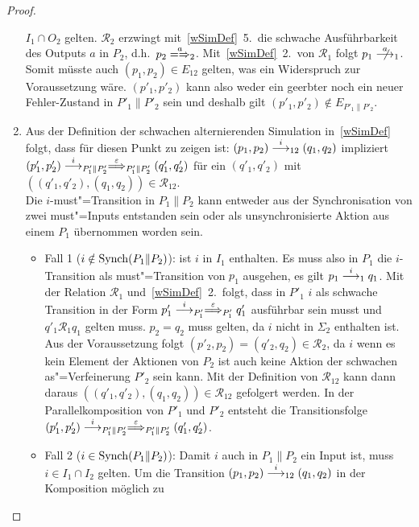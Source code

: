 \begin{proof}
\begin{enumerate}
      $I_1\cap O_2$ gelten. $\mathcal{R}_2$ erzwingt mit~\ref{wSimDef}~5.\ die
      schwache Ausführbarkeit des Outputs $a$ in $P_2$, d.h.\ $p_2
      \weakmay[a]_2$. Mit~\ref{wSimDef}~2.\ von $\mathcal{R}_1$ folgt $p_1
      \nmust[a]_1$. Somit müsste auch $(p_1,p_2)\in E_{12}$ gelten, was ein
      Widerspruch zur Voraussetzung wäre. $(p'_1,p'_2)$ kann also weder ein
      geerbter noch ein neuer Fehler-Zustand in $P'_1\|P'_2$ sein und deshalb
      gilt $(p'_1,p'_2)\notin E_{P'_1\|P'_2}$.
    \item Aus der Definition der schwachen alternierenden
      Simulation in~\ref{wSimDef} folgt, dass für diesen Punkt zu zeigen ist:
      $(p_1,p_2)\must[i]_{12}(q_1,q_2)$ impliziert $(p'_1,p'_2)
      \must[i]_{P'_1\|P'_2} \weakmust[\varepsilon]_{P'_1\|P'_2} (q'_1,q'_2)$
      für ein $(q'_1,q'_2)$ mit $((q'_1,q'_2),(q_1,q_2)) \in
      \mathcal{R}_{12}$.\\
      Die $i$-must"=Transition in $P_1\|P_2$ kann entweder aus der
      Synchronisation von zwei must"=Inputs entstanden sein oder als
      unsynchronisierte Aktion aus einem $P_1$ übernommen worden sein.
      \begin{itemize}
        \item Fall 1 ($i\notin\mathrm{Synch} (P_1\|P_2)$): \OBdA{} ist $i$ in $I_1$
          enthalten. Es muss also in $P_1$ die $i$-Transition als
          must"=Transition von $p_1$ ausgehen, es gilt $p_1\must[i]_1 q_1$. Mit
          der Relation $\mathcal{R}_1$ und~\ref{wSimDef}~2.\ folgt, dass in
          $P'_1$ $i$ als schwache Transition in der Form $p'_1\must[i]_{P'_1}
          \weakmust[\varepsilon]_{P'_1}q'_1$ ausführbar sein musst und $q'_1
          \mathcal{R}_1q_1$ gelten muss. $p_2=q_2$ muss gelten, da $i$ nicht in
          $\Sigma _2$ enthalten ist. Aus der Voraussetzung folgt $(p'_2,p_2) =
          (q'_2,q_2) \in \mathcal{R}_2$, da $i$ wenn es kein Element der
          Aktionen von $P_2$ ist auch keine Aktion der schwachen
          as"=Verfeinerung $P'_2$ sein kann. Mit der Definition von
          $\mathcal{R}_{12}$ kann dann daraus $((q'_1,q'_2),(q_1,q_2)) \in
          \mathcal{R}_{12}$ gefolgert werden. In der Parallelkomposition von
          $P'_1$ und $P'_2$ entsteht die Transitionsfolge
          $(p'_1,p'_2)\must[i]_{P'_1\|P'_2} \weakmust[\varepsilon]_{P'_1\|P'_2}
          (q'_1,q'_2)$.
        \item Fall 2 ($i\in\mathrm{Synch} (P_1\|P_2)$): Damit $i$ auch in $P_1\|P_2$
          ein Input ist, muss $i\in I_1\cap I_2$ gelten. Um die Transition
          $(p_1,p_2)\must[i]_{12}(q_1,q_2)$ in der Komposition möglich zu

\end{itemize}
\end{enumerate}
\end{proof}
